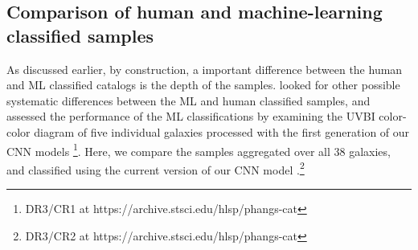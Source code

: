 \documentclass[linenumbers]{aastex63}
\begin{document}
{%



\subsection{Comparison of human and machine-learning classified samples}\label{ssect:cc_compare}
As discussed earlier, by construction, a important difference between the human and ML classified catalogs is the depth of the samples.
\citet{whitmore_star_2021} looked for other possible systematic differences between the ML and human classified samples, and assessed the performance of the ML classifications by examining the UVBI color-color diagram of five individual galaxies processed with the first generation of our CNN models \citep{wei_deep_2020}\footnote{DR3/CR1 at https://archive.stsci.edu/hlsp/phangs-cat}.
Here, we compare the samples aggregated over all 38 galaxies, and classified using the current version of our CNN model \citep{hannon_star_2023}.\footnote{DR3/CR2 at https://archive.stsci.edu/hlsp/phangs-cat} 

}
\end{document}
